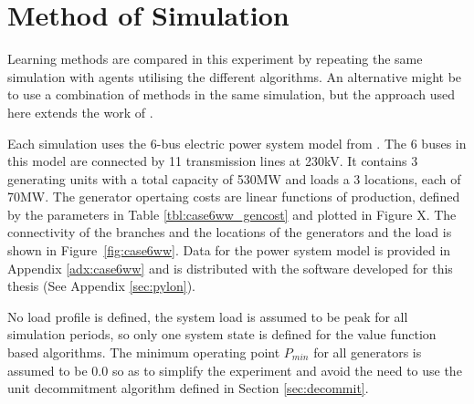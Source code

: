 \section{Method of Simulation}
Learning methods are compared in this experiment by repeating the same
simulation with agents utilising the different algorithms.  An alternative
might be to use a combination of methods in the same simulation, but the
approach used here extends the work of .

Each simulation uses the 6-bus electric power system model from .  The 6 buses in this model are connected by
11 transmission lines at 230kV.  It contains 3 generating units with a total
capacity of 530MW and loads a 3 locations, each of 70MW.  The generator
opertaing costs are linear functions of production, defined by the parameters
in Table \ref{tbl:case6ww_gencost} and plotted in Figure X.  The connectivity
of the branches and the locations of the generators and the load is shown in
Figure~\ref{fig:case6ww}.  Data for the power system model is provided in
Appendix \ref{adx:case6ww} and is distributed with the software developed for
this thesis (See Appendix \ref{sec:pylon}).

%

No load profile is defined, the system load is assumed to be peak for all
simulation periods, so only one system state is defined for the value function
based algorithms.  The minimum operating point $P_{min}$ for all generators is
assumed to be $0.0$ so as to simplify the experiment and avoid the need to use
the unit decommitment algorithm defined in Section \ref{sec:decommit}.


